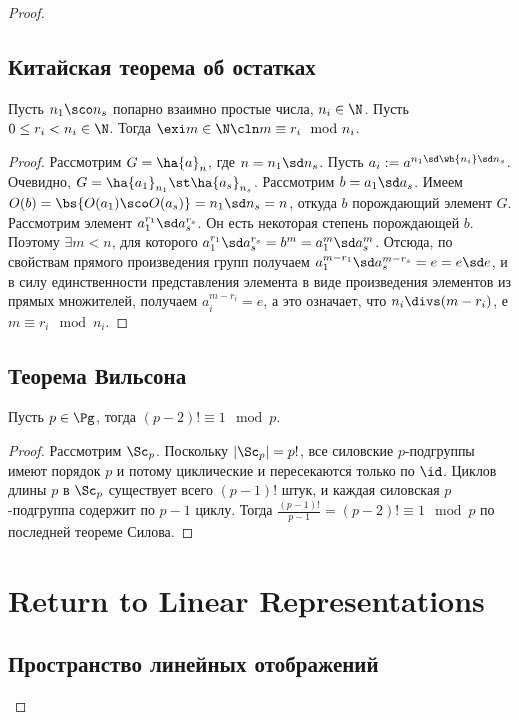 \documentclass[a4paper]{article}
\begin{document}
\begin{proof}
\subsection{Китайская теорема об остатках}

\begin{theorem}
Пусть $n_1\sco n_s$ попарно взаимно простые числа,
$n_i \in \N$. Пусть $0 \le r_i < n_i \in \N$. Тогда $\exi m \in \N\cln m \equiv r_i \mod n_i$.
\end{theorem}
\begin{proof}
Рассмотрим $G = \ha{a}_n$, где
$n=n_1\sd n_s$. Пусть $a_i := a^{n_1\sd \wh{n_i}\sd n_s}$.
Очевидно, $G = \ha{a_1}_{n_1}\st \ha{a_s}_{n_s}$. Рассмотрим $b =
a_1\sd a_s$. Имеем $O(b)=\bs{O(a_1)\sco O(a_s)}=n_1\sd n_s=n$,
откуда $b$ порождающий элемент $G$. Рассмотрим элемент
$a_1^{r_1}\sd a_s^{r_s}$. Он есть некоторая степень порождающей
$b$. Поэтому $\exi m < n$, для которого $a_1^{r_1}\sd
a_s^{r_s}=b^m=a_1^m\sd a_s^m$. Отсюда, по свойствам прямого
произведения групп получаем $a_1^{m-r_1}\sd a_s^{m-r_s}=e=e\sd e$,
и в силу единственности представления элемента в виде произведения
элементов из прямых множителей, получаем $a_i^{m-r_i}=e$, а это
означает, что $n_i \divs (m-r_i)$, е $m \equiv r_i \mod n_i$.
\end{proof}

\subsection{Теорема Вильсона}

\begin{theorem}[Вильсона]
Пусть $p \in \Pg$, тогда $(p-2)! \equiv 1 \mod p$.
\end{theorem}
\begin{proof}
Рассмотрим $\Sc_p$. Поскольку $|\Sc_p|=p!$, все силовские $p$-подгруппы имеют порядок $p$ и потому
циклические и пересекаются только по $\id$. Циклов длины $p$ в $\Sc_p$ существует всего $(p-1)!$ штук, и
каждая силовская $p$-подгруппа содержит по $p-1$ циклу. Тогда $\frac{(p-1)!}{p-1}=(p-2)!  \equiv 1 \mod p$ по
последней теореме Силова.
\end{proof}

\section{Return to Linear Representations}

\subsection{Пространство линейных отображений}


\end{proof}
\end{document}

